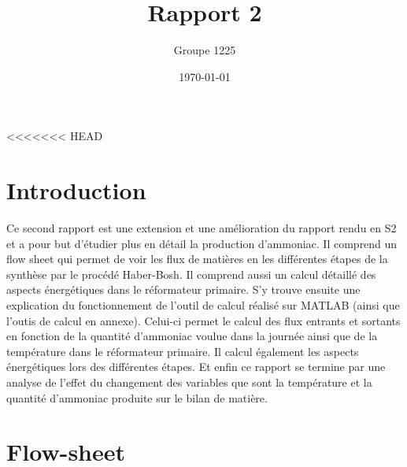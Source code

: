 \documentclass[a4paper, oneside, 12pt]{article}
\title{Rapport 2}
\author{Groupe 1225}
\date{\today}
\begin{document}
\maketitle

<<<<<<< HEAD
\section{Introduction}

Ce second rapport est une extension et une amélioration du rapport rendu en S2 et a pour but d'étudier plus en détail la production d'ammoniac. Il comprend un flow sheet qui permet de voir les flux de matières en les différentes étapes de la synthèse par le procédé Haber-Bosh. Il comprend aussi un calcul détaillé des aspects énergétiques dans le réformateur primaire. S’y trouve ensuite une explication du fonctionnement de l’outil de calcul réalisé sur MATLAB (ainsi que l'outis de calcul en annexe). Celui-ci permet le calcul des flux entrants et sortants en fonction de la quantité d'ammoniac voulue dans la journée ainsi que de la température dans le réformateur primaire. Il calcul également les aspects énergétiques lors des différentes étapes. 
Et enfin ce rapport se termine par une analyse de l'effet du changement des variables que sont la température et la quantité d'ammoniac produite sur le bilan de matière.

\section{Flow-sheet}
\end{document}
